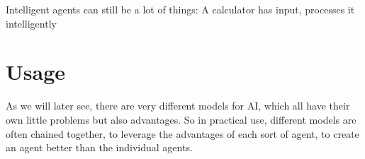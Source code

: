 Intelligent agents can still be a lot of things: A calculator has input, processes it intelligently 

\section{Usage}
As we will later see, there are very different models for AI, which all have their own little problems but also advantages. So in practical use, different models are often chained together, to leverage the advantages of each sort of agent, to create an agent better than the individual agents.